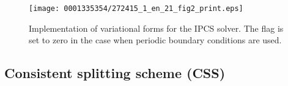 \begin{figure}[!t]
\vspace*{12pt}
\centering
\texttt{[image: 0001335354/272415\_1\_en\_21\_fig2\_print.eps]}
\caption{Implementation of variational forms for the IPCS
solver. The flag  is set to zero in the case when
periodic boundary conditions are used.}
\label{fig:IPCS}\vspace*{8pt}
\end{figure}

\subsection{Consistent splitting scheme (CSS)}
\label{sec:css}

